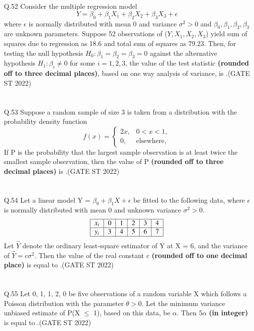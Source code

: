 \documentclass[journal,12pt,onecolumn]{IEEEtran}
\theoremstyle{remark}
\begin{document}
\\
\\
Q.52 Consider the multiple regression model
\[
Y = \beta_0 + \beta_1X_1 + \beta_2X_2 + \beta_3X_3 + \epsilon
\]
where $\epsilon$ is normally distributed with mean 0 and variance $\sigma^2 > 0$ and $\beta_0, \beta_1, \beta_2, \beta_3$ are unknown parameters. Suppose 52 observations of ($Y, X_1, X_2, X_3$) yield sum of squares due to regression as 18.6 and total sum of squares as 79.23. Then, for testing the null hypothesis $H_0: \beta_1 = \beta_2 = \beta_3 = 0$ against the alternative hypothesis $H_1: \beta_i \neq 0$ for some $i = 1, 2, 3$, the value of the test statistic \textbf{(rounded off to three decimal places)}, based on one way analysis of variance, is \underline{\hspace{2cm}}.\hfill (GATE ST 2022)\\
\\
\\
Q.53 Suppose a random sample of size 3 is taken from a distribution with the probability density function 
\[
f(x) = \begin{cases}
	2x, & 0 < x < 1, \\
	0, & \text{elsewhere},
\end{cases}
\]
If P is the probability that the largest sample observation is at least twice the smallest sample observation, then the value of P \textbf{(rounded off to three decimal places)} is \underline{\hspace{2cm}}.\hfill (GATE ST 2022)\\
\\
\\
Q.54 Let a linear model Y = $\beta_0 + \beta_1X + \epsilon$ be fitted to the following data, where $\epsilon$ is normally distributed with mean 0 and unknown variance $\sigma^2 > 0$. 
\[
\begin{tabular}{|c|c|c|c|c|c|}
	\hline
	$x_i$ & 0 & 1 & 2 & 3 & 4 \\
	\hline
	$y_i$ & 3 & 4 & 5 & 6 & 7 \\
	\hline
\end{tabular}
\]
Let $\hat{Y}$ denote the ordinary least-square estimator of Y at X = 6, and the variance of $\hat{Y} = c\sigma^2$. Then the value of the real constant c \textbf{(rounded off to one decimal place)} is equal to \underline{\hspace{2cm}}.\hfill (GATE ST 2022)\\
\\
\\
Q.55 Let 0, 1, 1, 2, 0 be five observations of a random variable X which follows a Poisson distribution with the parameter $\theta > 0$. Let the minimum variance unbiased estimate of P(X $\leq$ 1), based on this data, be $\alpha$. Then 5$\alpha$ \textbf{(in integer)} is equal to \underline{\hspace{2cm}}.\hfill (GATE ST 2022)\\
\end{document}
